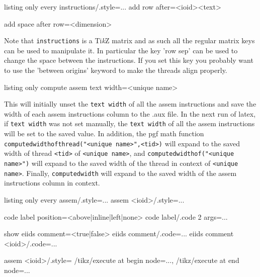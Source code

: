 \documentclass[a4paper]{article}
\newcommand{\TikZ}{Ti\textit{k}Z}
\begin{document}
\begin{tcblisting}{listing only}
every instructions/.style={...}
add row after={<ioid>}{<text>} %

add space after row=<dimension>
\end{tcblisting}
Note that \lstinline|instructions| is a \TikZ{} matrix and as such all the
regular matrix keys can be used to manipulate it. In particular the key
'row sep' can be used to change the space between the instructions. If
you set this key you probably want to use the 'between origins' keyword
to make the threads align properly.

\begin{tcblisting}{listing only}
compute assem text width={<unique name>} %
\end{tcblisting}
This will initially unset the \lstinline|text width| of all the assem instructions
and save the width of each assem instructions column to the .aux file.
In the next run of latex, if \lstinline|text width| was not set manually, the
\lstinline|text width| of all the assem instructions will be set to the saved
value.
In addition, the pgf math function
\lstinline+computedwidthofthread("<unique name>",<tid>)+ will expand
to the saved width of thread \lstinline|<tid>| of \lstinline|<unique name>|, and
\lstinline+computedwidthof("<unique name>")+ will expand to the saved
width of the thread in context of \lstinline|<unique name>|. Finally,
\lstinline+computedwidth+ will expand to the saved width of the assem
instructions column in context.

\begin{tcblisting}{listing only}
every assem/.style={...}
assem <ioid>/.style={...}

code label position=<above|inline|left|none> %
code label/.code 2 args={...} %

show eiids comment=<true|false> %
eiids comment/.code={...} %
eiids comment <ioid>/.code={...}

assem <ioid>/.style={
  /tikz/execute at begin node={...},
  /tikz/execute at end node={...}
}
\end{tcblisting}
\end{document}
